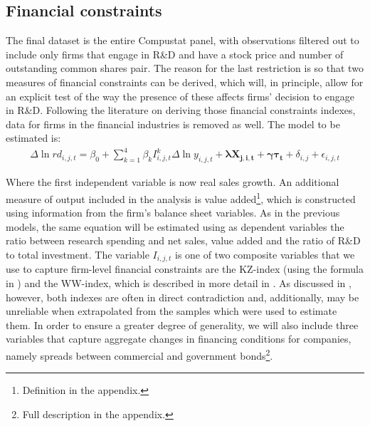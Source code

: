 \documentclass{_latex/house}
\begin{document}
\subsection{Financial constraints} \label{financialconstraints}
The final dataset is the entire Compustat panel, with observations filtered out to include only firms that engage in R\&D and have a stock price and number of outstanding common shares pair. The reason for the last restriction is so that two measures of financial constraints can be derived, which will, in principle, allow for an explicit test of the way the presence of these affects firms' decision to engage in R\&D. Following the literature on deriving those financial constraints indexes, data for firms in the financial industries is removed as well. The model to be estimated is:
\begin{align} \label{eq:eq4}
\Delta \ln rd_{i,j,t}=\beta_{0}+\sum_{k=1}^{4} \beta_{k} I^{k}_{i,j,t} \Delta \ln y_{i,j,t}+\boldsymbol{\lambda X_{j,i,t}}+\boldsymbol{\gamma \tau_{t}}+\delta_{i,j}+\epsilon_{i,j,t}
\end{align}

Where the first independent variable is now real sales growth. An additional measure of output included in the analysis is value added\footnote{Definition in the appendix.}, which is constructed using information from the firm's balance sheet variables. As in the previous models, the same equation will be estimated using as dependent variables the ratio between research spending and net sales, value added and the ratio of R\&D to total investment. The variable $I_{i,j,t}$ is one of two composite variables that we use to capture firm-level financial constraints are the KZ-index (using the formula in \cite{RePEc:oup:rfinst:v:14:y:2001:i:2:p:529-54}) and the WW-index, which is described in more detail in \cite{RePEc:oup:rfinst:v:19:y:2006:i:2:p:531-559}. As discussed in \cite{Hadlock01052010}, however, both indexes are often in direct contradiction and, additionally, may be unreliable when extrapolated from the samples which were used to estimate them. In order to ensure a greater degree of generality, we will also include three variables that capture aggregate changes in financing conditions for companies, namely spreads between commercial and government bonds\footnote{Full description in the appendix.}.
\end{document}
